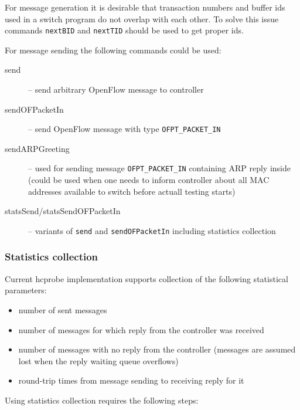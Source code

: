 \documentclass[9pt,a4paper]{article}
\begin{document}
For message generation it is desirable that transaction numbers and
buffer ids used in a switch program do not overlap with each
other. To solve this issue commands \lstinline!nextBID! and
\lstinline!nextTID! should be used to get proper ids.

For message sending the following commands could be used:

\begin{description}

  \item[send] -- send arbitrary OpenFlow message to controller

  \item[sendOFPacketIn] -- send OpenFlow message with type
    \lstinline!OFPT_PACKET_IN!

  \item[sendARPGreeting] -- used for sending message
    \lstinline!OFPT_PACKET_IN!  containing ARP reply inside (could be
    used when one needs to inform controller about all MAC
    addresses available to switch before actuall testing starts)

  \item[statsSend/statsSendOFPacketIn] -- variants of \lstinline!send!
    and \lstinline!sendOFPacketIn! including statistics collection

\end{description}

\subsubsection{Statistics collection}

Current hcprobe implementation supports collection of the following
statistical parameters:

\begin{itemize}
  \item number of sent messages
  \item number of messages for which reply from the controller was
    received
  \item number of messages with no reply from the controller (messages are
    assumed lost when the reply waiting queue overflows)
  \item round-trip times from message sending to receiving reply for it
\end{itemize}

Using statistics collection requires the following steps:
\end{document}
